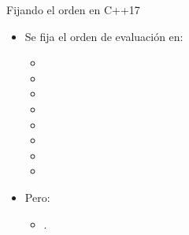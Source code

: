 \begin{frame}[t,fragile]{Fijando el orden en C++17}
\begin{itemize}
  \item Se fija el orden de evaluación en:
    \begin{itemize}
      \item {}
      \item {}
      \item {}
      \item {}
      \item {}
      \item {}
      \item {}
      \item {}
    \end{itemize}

  \vfill\pause
  \item Pero:
    \begin{itemize}
      \item {}.
    \end{itemize}
\end{itemize}
\end{frame}
